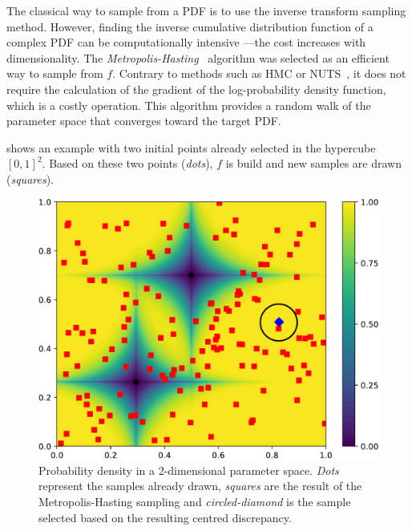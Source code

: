 
The classical way to sample from a PDF is to use the inverse transform sampling method. However, finding the inverse cumulative distribution function of a complex PDF can be computationally intensive ---\thinspace the cost increases with dimensionality. The \emph{Metropolis-Hasting}~\citep{Hastings1979} algorithm was selected as an efficient way to sample from $f$. Contrary to methods such as HMC or NUTS~\citep{Hoffman2011}, it does not require the calculation of the gradient of the log-probability density function, which is a costly operation. This algorithm provides a random walk of the parameter space that converges toward the target PDF.



 shows an example with two initial points already selected in the hypercube $[0, 1]^2$. Based on these two points (\emph{dots}), $f$ is build and new samples are drawn (\emph{squares}).

\begin{figure}[!h]
\centering
\includegraphics[width=0.7\linewidth,keepaspectratio]{fig/contributions/doe/sampling_KDE.pdf}
\caption{Probability density in a 2-dimensional parameter space. \emph{Dots} represent the samples already drawn, \emph{squares} are the result of the Metropolis-Hasting sampling and \emph{circled-diamond} is the sample selected based on the resulting centred discrepancy.}
\label{fig:sample_kde}
\end{figure}

